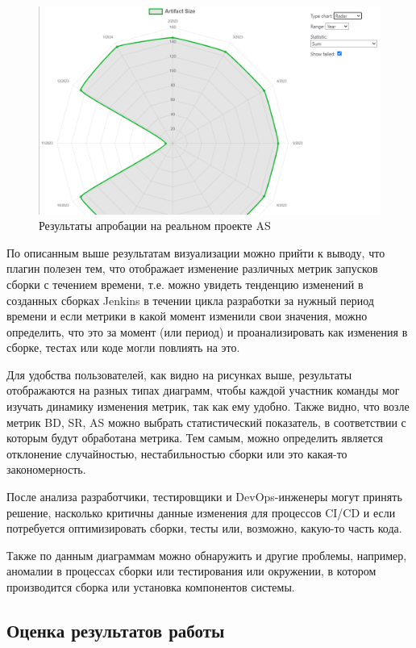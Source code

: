  \begin{figure}[ht!] 
	\center
	\includegraphics [scale=0.47] {my_folder/images//realres2}
	\caption{Результаты апробации на реальном проекте AS} 
	\label{fig:realres2}  
\end{figure}

По описанным выше результатам визуализации можно прийти к выводу, что плагин полезен тем, что отображает изменение различных метрик запусков сборки с течением времени, т.е. можно увидеть тенденцию изменений в созданных сборках Jenkins в течении цикла разработки за нужный период времени и если метрики в какой момент изменили свои значения, можно определить, что это за момент (или период) и проанализировать как изменения в сборке, тестах или коде могли повлиять на это.

Для удобства пользователей, как видно на рисунках выше, результаты отображаются на разных типах диаграмм, чтобы каждой участник команды мог изучать динамику изменения метрик, так как ему удобно. Также видно, что возле метрик BD, SR, AS можно выбрать статистический показатель, в соответствии с которым будут обработана метрика. Тем самым, можно определить является отклонение случайностью, нестабильностью сборки или это какая-то закономерность.

После анализа разработчики, тестировщики и DevOps-инженеры могут принять решение, насколько критичны данные изменения для процессов CI/CD и если потребуется оптимизировать сборки, тесты или, возможно, какую-то часть кода.

Также по данным диаграммам можно обнаружить и другие проблемы, например, аномалии в процессах сборки или тестирования или окружении, в котором производится сборка или установка компонентов системы.

 \subsection{Оценка результатов работы}
 
